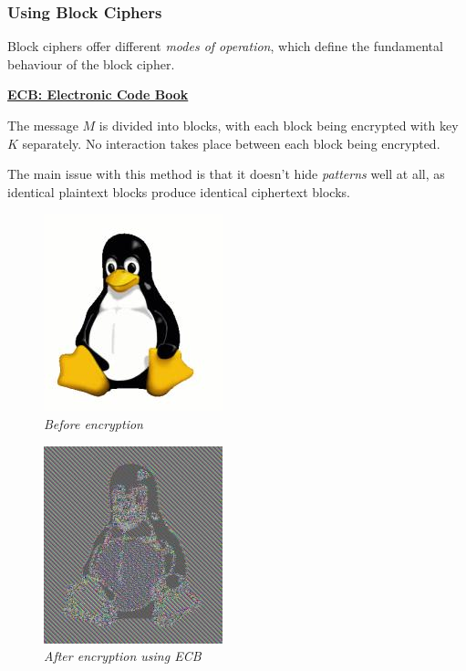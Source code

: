 \documentclass{article}
\begin{document}
\subsubsection{Using Block Ciphers}

Block ciphers offer different \textit{modes of operation}, which define the fundamental behaviour of the block cipher.

\textbf{\underline{ECB: Electronic Code Book}}

The message $M$ is divided into blocks, with each block being encrypted with key $K$ separately. No interaction takes place between each block being encrypted.

The main issue with this method is that it doesn't hide \textit{patterns} well at all, as identical plaintext blocks produce identical ciphertext blocks.

\begin{figure}[htb!]
  \begin{minipage}{0.5\linewidth}
    \centering
    \includegraphics[scale=0.4]{tux.jpg}\\
    \textit{Before encryption}
  \end{minipage}
  \begin{minipage}{0.5\linewidth}
    \centering
    \includegraphics[scale=0.4]{tuxecb.jpg}\\
    \textit{After encryption using ECB}
  \end{minipage}
\end{figure}
\end{document}
